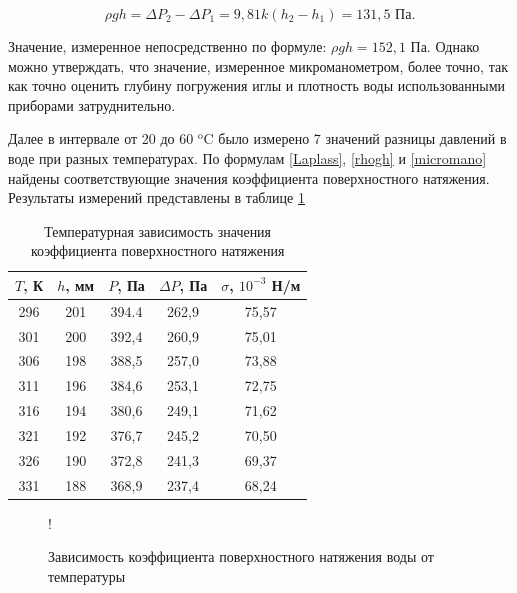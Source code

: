 \documentclass[a4paper,12pt]{article} %
\begin{document}
\begin{equation}
    \rho gh = \Delta P_2 - \Delta P_1 = 9,81k(h_2 - h_1) = 131,5 \text{ Па}.
\end{equation}

Значение, измеренное непосредственно по формуле: $\rho gh = 152,1$ Па. Однако можно утверждать, что значение, измеренное микроманометром, более точно, так как точно оценить глубину погружения иглы и плотность воды использованными приборами затруднительно.

Далее в интервале от 20 до 60 $^\text{o}$C было измерено 7 значений разницы давлений в воде при разных температурах. По формулам \eqref{Laplass}, \eqref{rhogh} и \eqref{micromano} найдены соответствующие значения коэффициента поверхностного натяжения. Результаты измерений представлены в таблице \ref{tab:tensions}

\begin{table}[]
    \centering
    \begin{tabular}{|c|c|c|c|c|}\hline
        $T$, К & $h$, мм & $P$, Па & $\Delta P$, Па & $\sigma$, $10^{-3}$ Н/м \\ \hline
        296 & 201 & 394.4 & 262,9 & 75,57 \\ \hline
        301 & 200 & 392,4 & 260,9 & 75,01 \\ \hline
        306 & 198 & 388,5 & 257,0 & 73,88 \\ \hline
        311 & 196 & 384,6 & 253,1 & 72,75 \\ \hline
        316 & 194 & 380,6 & 249,1 & 71,62 \\ \hline
        321 & 192 & 376,7 & 245,2 & 70,50 \\ \hline
        326 & 190 & 372,8 & 241,3 & 69,37 \\ \hline
        331 & 188 & 368,9 & 237,4 & 68,24 \\ \hline
        \end{tabular}
    \caption{Температурная зависимость значения коэффициента поверхностного натяжения}
    \label{tab:tensions}
\end{table}

\begin{figure}
\centering
{} {!} {
}
\caption{Зависимость коэффициента поверхностного натяжения воды от температуры}
\label{graph1}
\end{figure}
\end{document}

